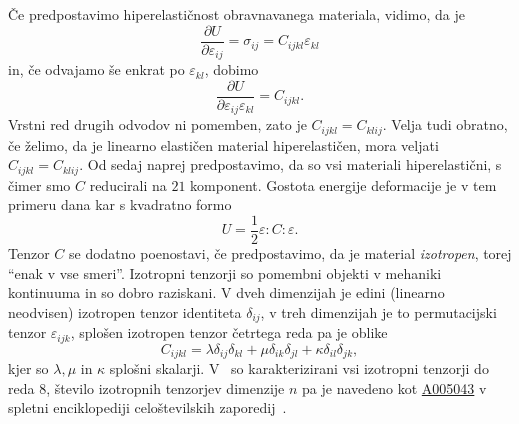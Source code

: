 \documentclass[12pt,a4paper,twoside]{article}
\theoremstyle{definition} %
\theoremstyle{plain} %
\numberwithin{equation}{section}
\newcommand{\eps}{\varepsilon}
\newcommand{\dpar}[2]{\ensuremath{\frac{\partial #1}{\partial #2}}}
\begin{document}
Če predpostavimo hiperelastičnost obravnavanega materiala, vidimo, da je
\begin{equation}
  \dpar{U}{\eps_{ij}} = \sigma_{ij} = C_{ijkl}\eps_{kl}
\end{equation}
in, če odvajamo še enkrat po $\eps_{kl}$, dobimo
\begin{equation}
  \dpar{U}{\eps_{ij}\eps_{kl}} = C_{ijkl}.
\end{equation}
Vrstni red drugih odvodov ni pomemben, zato je $C_{ijkl} = C_{klij}$. Velja tudi obratno, če želimo,
da je linearno elastičen material hiperelastičen, mora veljati $C_{ijkl} = C_{klij}$.
Od sedaj naprej predpostavimo, da so vsi materiali hiperelastični, s čimer smo $C$ reducirali
na $21$ komponent. Gostota energije deformacije je v tem primeru dana kar s kvadratno formo
\begin{equation}
  U = \frac12 \eps:C:\eps.
  \label{eq:energy}
\end{equation}
Tenzor $C$ se dodatno poenostavi, če predpostavimo, da je material \emph{izotropen}, torej ``enak
v vse smeri''.  Izotropni tenzorji so pomembni objekti v mehaniki kontinuuma in so dobro
raziskani. V dveh dimenzijah je edini (linearno neodvisen) izotropen tenzor identiteta
$\delta_{ij}$, v treh dimenzijah je to permutacijski tenzor $\eps_{ijk}$, splošen izotropen tenzor
četrtega reda pa je oblike
\begin{equation}
  \label{eq:isotropic}
   C_{ijkl} = \lambda \delta_{ij}\delta_{kl} + \mu \delta_{ik}\delta_{jl} +
   \kappa\delta_{il}\delta_{jk},
\end{equation}
kjer so $\lambda, \mu$ in $\kappa$ splošni skalarji. V~\cite{kearsley1975linearly} so
karakterizirani vsi izotropni tenzorji do reda 8, število izotropnih tenzorjev
dimenzije $n$ pa je navedeno kot \href{http://oeis.org/A005043}{A005043} v spletni enciklopediji
celoštevilskih zaporedij~\cite{oeis}.
\end{document}
